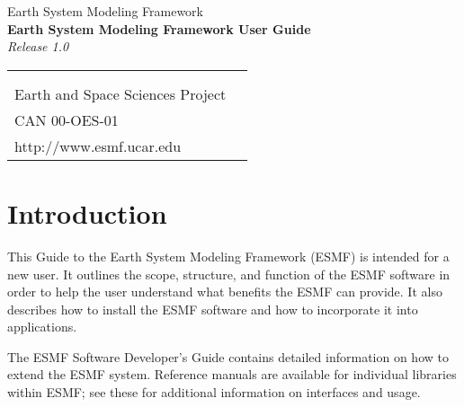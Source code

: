 \documentclass[]{article}
\begin{document}

\begin{titlepage}

\begin{center}
{\Large Earth System Modeling Framework } \\
\vspace{.25in}
{\Large {\bf Earth System Modeling Framework User Guide}} \\
\vspace{.25in}
{\large {\it Release 1.0}}
\vspace{.5in}
\end{center}

\begin{latexonly}
\vspace{5.5in}
\begin{tabular}{p{5in}p{.9in}}
\hrulefill \\
\noindent {\bf NASA High Performance Computing and Communications Program} \\
\noindent Earth and Space Sciences Project \\
\noindent CAN 00-OES-01 \\
\noindent http://www.esmf.ucar.edu \\
\end{tabular}
\end{latexonly}

\end{titlepage}

\tableofcontents

\newpage

\setlength{\parskip}{2ex}
\setlength{\parindent}{0ex}

\section{Introduction}

This Guide to the Earth System Modeling Framework (ESMF) is intended 
for a new user.  It outlines the scope, structure, and function of the 
ESMF software in order to help the user understand what benefits the ESMF 
can provide.  It also describes how to install the ESMF software and how 
to incorporate it into applications.

The ESMF Software Developer's Guide contains detailed information on how 
to extend the ESMF system.  Reference manuals are available for individual 
libraries within ESMF; see these for additional information on interfaces 
and usage.







\end{document}
